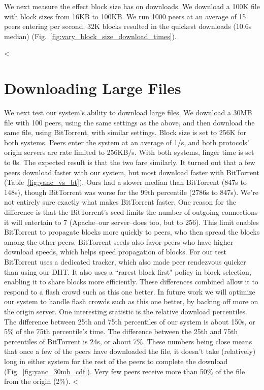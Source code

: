 We next measure the effect block size has on downloads. We download a 100K file with block sizes from 
16KB to 100KB. We run 1000 peers at an average of 15 peers entering per second. 32K blocks resulted 
in the quickest downloads (10.6s median) (Fig.~\ref{fig:vary_block_size_download_times}). 


<%

\section{Downloading Large Files}

We next test our system's ability to download large files. We download a 30MB file with 100 peers, 
using the same settings as the above, and then download the same file, using BitTorrent, with similar 
settings. Block size is set to 256K for both systems. Peers enter the system at an average of 1/s, 
and both protocols' origin servers are rate limited to 256KB/s. With both systems, linger time 
is set to 0s. The expected result is that the two fare similarly. It turned out that a few peers download 
faster with our system, but most download faster with BitTorrent (Table~\ref{fig:yanc_vs_bt}). 
Ours had a slower median than BitTorrent (847s to 148s), though BitTorrent was worse for the 99th 
percentile (2786s to 847s). We're not entirely sure exactly what makes BitTorrent faster.  One reason for the difference is that the BitTorrent's seed 
limits the number of outgoing connections it will entertain to 7 (Apache--our server--does 
too, but to 256). This limit enables BitTorrent to propagate blocks more quickly to peers, who then 
spread the blocks among the other peers. BitTorrent seeds also favor peers who have higher download 
speeds, which helps speed propagation of blocks. For our test BitTorrent uses a dedicated tracker, 
which also made peer rendezvous quicker than using our DHT.  It also uses a ``rarest block first" policy in block selection, enabling it to share blocks more efficiently.  These differences combined allow it 
to respond to a flash crowd such as this one better.  In future work we will optimize our system to handle flash crowds such as this one better, by backing off more on the origin server.  One interesting statistic is the relative download percentiles. The difference between 25th and 75th percentiles of our system is about 150s, 
or 5\% of the 75th percentile's time. The difference between the 25th and 75th percentiles of BitTorrent 
is 24s, or about 7\%. These numbers being close means that once a few of the peers have downloaded 
the file, it doesn't take (relatively) long in either system for the rest of the peers to complete 
the download (Fig.~\ref{fig:yanc_30mb_cdf}). Very few peers receive more than 50\% of the file 
from the origin (2\%). 
<%

